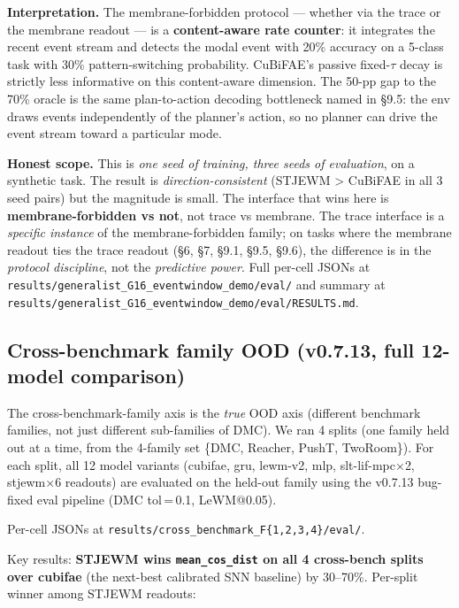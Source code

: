 \documentclass{article}
\begin{document}
\textbf{Interpretation.} The membrane-forbidden protocol --- whether
via the trace or the membrane readout --- is a \textbf{content-aware
rate counter}: it integrates the recent event stream and detects the
modal event with 20\% accuracy on a 5-class task with 30\%
pattern-switching probability. CuBiFAE's passive fixed-$\tau$ decay
is strictly less informative on this content-aware dimension.
The 50-pp gap to the 70\% oracle is the same plan-to-action decoding
bottleneck named in §9.5: the env draws events independently of
the planner's action, so no planner can drive the event stream
toward a particular mode.

\textbf{Honest scope.} This is \emph{one seed of training, three
seeds of evaluation}, on a synthetic task. The result is
\emph{direction-consistent} (STJEWM > CuBiFAE in all 3 seed pairs)
but the magnitude is small. The interface that wins here is
\textbf{membrane-forbidden vs not}, not trace vs membrane. The
trace interface is a \emph{specific instance} of the
membrane-forbidden family; on tasks where the membrane readout
ties the trace readout (§6, §7, §9.1, §9.5, §9.6), the
difference is in the \emph{protocol discipline}, not the
\emph{predictive power}. Full per-cell JSONs at
\texttt{results/generalist\_G16\_eventwindow\_demo/eval/} and
summary at
\texttt{results/generalist\_G16\_eventwindow\_demo/eval/RESULTS.md}.

\subsection{Cross-benchmark family OOD (v0.7.13, full 12-model comparison)}

The cross-benchmark-family axis is the \emph{true} OOD axis (different
benchmark families, not just different sub-families of DMC). We
ran 4 splits (one family held out at a time, from the
4-family set \{DMC, Reacher, PushT, TwoRoom\}). For each split,
all 12 model variants (cubifae, gru, lewm-v2, mlp, slt-lif-mpc$\times$2,
stjewm$\times$6 readouts) are evaluated on the held-out family using the
v0.7.13 bug-fixed eval pipeline (DMC tol\,=\,0.1, LeWM@0.05).

Per-cell JSONs at \texttt{results/cross\_benchmark\_F\{1,2,3,4\}/eval/}.

Key results: \textbf{STJEWM wins \texttt{mean\_cos\_dist} on all 4 cross-bench
splits over cubifae} (the next-best calibrated SNN baseline) by
30--70\%. Per-split winner among STJEWM readouts:
\end{document}
